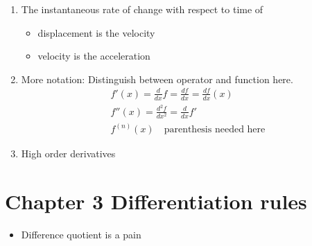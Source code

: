 \documentclass{article}
\begin{document}
\begin{enumerate}
\begin{enumerate}
\item The instantaneous rate of change with respect to time of
\begin{itemize}
\item displacement is the velocity
\item velocity is the acceleration
\end{itemize}
\item More notation: Distinguish between operator and function here. 
\begin{align*}
f'(x) = \frac{d}{dx} f= \frac{df}{dx} = \frac{df}{dx}(x) \\
f''(x) = \frac{d^2f}{dx^2}= \frac{d}{dx}f' \\
f^{(n)}(x) \quad \text{parenthesis needed here}
\end{align*} 
\item High order derivatives
\end{enumerate}
\end{enumerate}


\section{Chapter 3 Differentiation rules}
\begin{itemize}
\item Difference quotient is a pain
\end{itemize}

\end{document}
